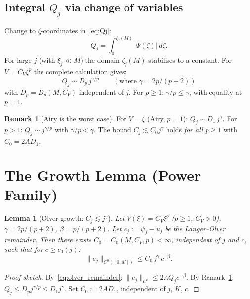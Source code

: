 \documentclass[12pt,a4paper]{amsart}
\newtheorem{lemma}[theorem]{Lemma}
\theoremstyle{definition}
\newtheorem{remark}[theorem]{Remark}
\begin{document}
\subsection{Integral $Q_j$ via change of variables}
Change to $\zeta$-coordinates in~\eqref{eq:Qj}:
\[
  Q_j = \int_0^{\zeta_j(M)} |\Psi(\zeta)|\,d\zeta.
\]
For large $j$ (with $\xi_j\ll M$) the domain $\zeta_j(M)$
stabilises to a constant.
For $V = C_V\xi^p$ the complete calculation gives:
\begin{equation}\label{eq:Qj_power}
  Q_j \sim D_p\,j^{\gamma/p}
  \qquad (\text{where }\gamma = 2p/(p+2))
\end{equation}
with $D_p = D_p(M, C_V)$ independent of $j$.
For $p\geq 1$: $\gamma/p \leq \gamma$, with equality at $p=1$.

\begin{remark}[Airy is the worst case]
\label{rem:airy_worst}
For $V=\xi$ (Airy, $p=1$):
$Q_j \sim D_1\,j^\gamma$.
For $p > 1$: $Q_j \sim j^{\gamma/p}$ with $\gamma/p < \gamma$.
The bound $C_j \lesssim C_0 j^\gamma$ holds
\emph{for all $p\geq 1$} with $C_0 = 2AD_1$.
\end{remark}

\section{The Growth Lemma (Power Family)}
\label{sec:growth}

\begin{lemma}[Olver growth: $C_j \lesssim j^\gamma$]
\label{lem:olver_growth}
Let $V(\xi) = C_V\xi^p$ ($p\geq 1$, $C_V>0$),
$\gamma = 2p/(p+2)$, $\beta = p/(p+2)$.
Let $e_j := \psi_j - u_j$ be the Langer--Olver remainder.
Then there exists $C_0 = C_0(M, C_V, p) < \infty$,
independent of $j$ and $c$, such that for $c\geq c_0(j)$:
\begin{equation}\label{eq:olver_growth}
  \|e_j\|_{C^0([0,M])} \leq C_0\,j^\gamma\,c^{-\beta}.
\end{equation}
\end{lemma}

\begin{proof}[Proof sketch]
By~\eqref{eq:olver_remainder}:
$\|e_j\|_{C^0} \leq 2AQ_j c^{-\beta}$.
By Remark~\ref{rem:airy_worst}:
$Q_j \leq D_p j^{\gamma/p} \leq D_1 j^\gamma$.
Set $C_0 := 2AD_1$, independent of $j$, $K$, $c$.
\end{proof}
\end{document}
